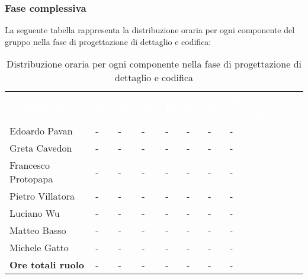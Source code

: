 \subsubsection{Fase complessiva}
La seguente tabella rappresenta la distribuzione oraria per ogni componente del gruppo nella fase di progettazione di dettaglio e codifica:
\begin{table}[!htbp]
\begin{center}
\renewcommand{\arraystretch}{1.25}
\begin{tabular}{ m{}<{\centering}  m{}<{\centering} m{}<{\centering} m{}<{\centering}  m{}<{\centering}  m{}<{\centering}  m{}<{\centering}  m{}<{\centering}   }
	\rowcolor{darkblue}
	\textcolor{white}{\textbf{Componente}} &\textcolor{white}{\textbf{Re}}&\textcolor{white}{\textbf{Ad}}&\textcolor{white}{\textbf{An}}&\textcolor{white}{\textbf{Pt}}&\textcolor{white}{\textbf{Pr}}&\textcolor{white}{\textbf{Ve}}&\textcolor{white}{\textbf{Ore complessive}}\\ 

	Edoardo Pavan & - & - & - & - & - & - & -\\	

	\rowcolor{gray!10} Greta Cavedon & - & - & - & - & - & - & -\\
	
	Francesco Protopapa & - & - & - & - & - & - & -\\
	
	\rowcolor{gray!10} Pietro Villatora & - & - & - & - & - & - & -\\
	
	Luciano Wu & - & - & - & - & - & - & -\\
	
	\rowcolor{gray!10} Matteo Basso & - & - & - & - & - & - & -\\
	
	Michele Gatto & - & - & - & - & - & - & -\\
	
	\rowcolor{gray!10} \textbf{Ore totali ruolo} & - & - & - & - & - & - & -\\

\end{tabular}
\caption{Distribuzione oraria per ogni componente nella fase di progettazione di dettaglio e codifica}
\end{center}
\end{table}

